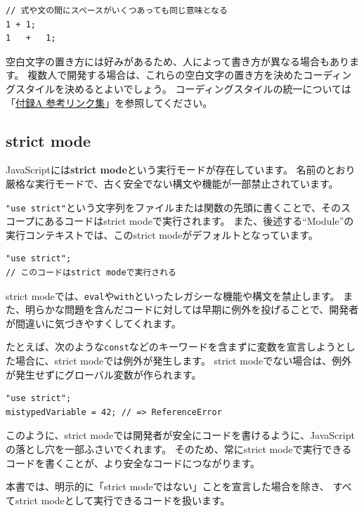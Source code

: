 \begin{lstlisting}
// 式や文の間にスペースがいくつあっても同じ意味となる
1 + 1;
1   +   1;
\end{lstlisting}

空白文字の置き方には好みがあるため、人によって書き方が異なる場合もあります。
複数人で開発する場合は、これらの空白文字の置き方を決めたコーディングスタイルを決めるとよいでしょう。
コーディングスタイルの統一については「\hyperlink{reference-links}{付録A 参考リンク集}」を参照してください。

\hypertarget{strict-mode}{%
\subsection{strict mode}\label{strict-mode}}

JavaScriptには\textbf{strict mode}という実行モードが存在しています。
名前のとおり厳格な実行モードで、古く安全でない構文や機能が一部禁止されています。

\texttt{"use strict"}という文字列をファイルまたは関数の先頭に書くことで、そのスコープにあるコードはstrict
modeで実行されます。
また、後述する``Module''の実行コンテキストでは、このstrict
modeがデフォルトとなっています。\enlargethispage{\baselineskip}

\begin{lstlisting}
"use strict";
// このコードはstrict modeで実行される
\end{lstlisting}

strict
modeでは、\texttt{eval}や\texttt{with}といったレガシーな機能や構文を禁止します。
また、明らかな問題を含んだコードに対しては早期に例外を投げることで、開発者が間違いに気づきやすくしてくれます。

たとえば、次のような\texttt{const}などのキーワードを含まずに変数を宣言しようとした場合に、strict
modeでは例外が発生します。 strict
modeでない場合は、例外が発生せずにグローバル変数が作られます。

\begin{lstlisting}
"use strict";
mistypedVariable = 42; // => ReferenceError
\end{lstlisting}

このように、strict
modeでは開発者が安全にコードを書けるように、JavaScriptの落とし穴を一部ふさいでくれます。
そのため、常にstrict
modeで実行できるコードを書くことが、より安全なコードにつながります。

本書では、明示的に「strict modeではない」ことを宣言した場合を除き、
すべてstrict modeとして実行できるコードを扱います。

